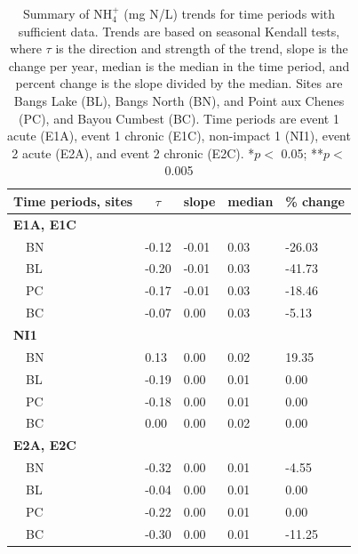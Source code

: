 \documentclass[letterpaper,12pt]{article}\usepackage[]{graphicx}\usepackage[]{color}
\begin{document}
\clearpage

\begin{table}[!tbp]
\caption{Summary of NH$_4^+$ (mg N/L) trends for time periods with sufficient data.  Trends are based on seasonal Kendall tests, where $\tau$ is the direction and strength of the trend, slope is the change per year, median is the median in the time period, and percent change is the slope divided by the median. Sites are Bangs Lake (BL), Bangs North (BN), and Point aux Chenes (PC), and Bayou Cumbest (BC). Time periods are event 1 acute (E1A), event 1 chronic (E1C), non-impact 1 (NI1), event 2 acute (E2A), and event 2 chronic (E2C). *$p <$ 0.05; **$p <$ 0.005\label{tab:NH4Ftrnd}} 
\begin{center}
\begin{tabular}{lllll}
\hline\hline
\multicolumn{1}{l}{Time periods, sites}&\multicolumn{1}{c}{$\tau$}&\multicolumn{1}{c}{slope}&\multicolumn{1}{c}{median}&\multicolumn{1}{c}{\% change}\tabularnewline
\hline
{\bfseries E1A, E1C}&&&&\tabularnewline
~~BN&-0.12&-0.01&0.03&-26.03\tabularnewline
~~BL&-0.20&-0.01&0.03&-41.73\tabularnewline
~~PC&-0.17&-0.01&0.03&-18.46\tabularnewline
~~BC&-0.07&0.00&0.03&-5.13\tabularnewline
\hline
{\bfseries NI1}&&&&\tabularnewline
~~BN&0.13&0.00&0.02&19.35\tabularnewline
~~BL&-0.19&0.00&0.01&0.00\tabularnewline
~~PC&-0.18&0.00&0.01&0.00\tabularnewline
~~BC&0.00&0.00&0.02&0.00\tabularnewline
\hline
{\bfseries E2A, E2C}&&&&\tabularnewline
~~BN&-0.32&0.00&0.01&-4.55\tabularnewline
~~BL&-0.04&0.00&0.01&0.00\tabularnewline
~~PC&-0.22&0.00&0.01&0.00\tabularnewline
~~BC&-0.30&0.00&0.01&-11.25\tabularnewline
\hline
\end{tabular}\end{center}
\end{table}
\end{document}
